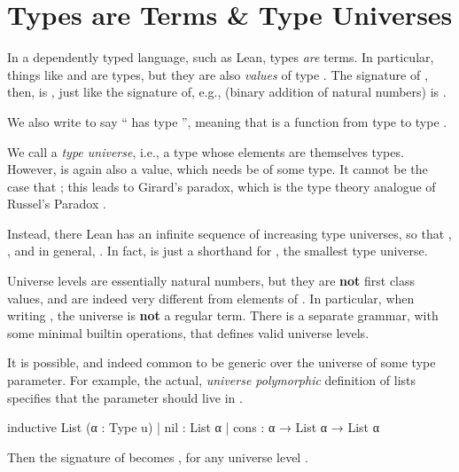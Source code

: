 \section{Types are Terms \& Type Universes}
In a dependently typed language, such as Lean, types \emph{are} terms. In particular, things like  and  are types, but they are also \emph{values} of type \Type.
The signature of , then, is , just like the signature of, e.g.,  (binary addition of natural numbers) is .

\begin{remark}
    We also write  to say `` has type '', meaning that  is a function from type  to type .
\end{remark}

We call \Type{} a \emph{type universe}, i.e., a type whose elements are themselves types. However, \Type{} is again also a value, which needs be of some type.
It cannot be the case that ; this leads to Girard's paradox, which is the type theory analogue of Russel's Paradox \cite{girardInterpretationFonctionelleElimination1972}.

Instead, there Lean has an infinite sequence of increasing type universes, so that , , and in general, . In fact,  is just a shorthand for , the smallest type universe.

Universe levels  are essentially natural numbers, but they are \textbf{not} first class values, and are indeed very different from elements of .
In particular, when writing , the universe  is \textbf{not} a regular term. There is a separate grammar, with some minimal builtin operations, that defines valid universe levels.

It is possible, and indeed common to be generic over the universe of some type parameter. For example, the actual, \emph{universe polymorphic} definition of lists specifies that the parameter  should live in .
\begin{leancode}
    inductive List (α : Type u)
    | nil  : List α
    | cons : α → List α → List α
\end{leancode}

Then the signature of  becomes , for any universe level .

